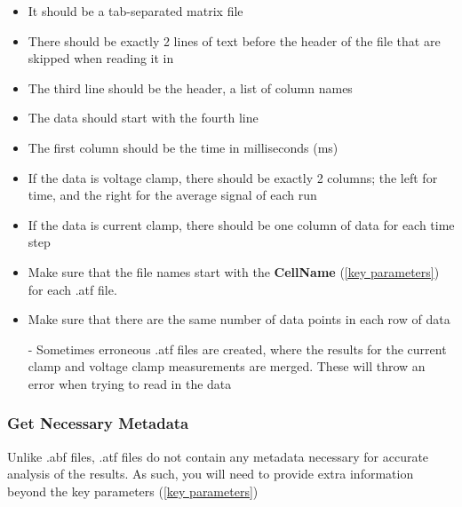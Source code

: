 \documentclass{article}
\begin{document}
\begin{itemize}
    \item It should be a tab-separated matrix file
    
    \item There should be exactly 2 lines of text before the header of the file that are skipped when reading it in
    
    \item The third line should be the header, a list of column names
    
    \item The data should start with the fourth line
    
    \item The first column should be the time in milliseconds (ms)
    
    \item If the data is voltage clamp, there should be exactly 2 columns; the left for time, and the right for the average signal of each run
    
    \item If the data is current clamp, there should be one column of data for each time step
    
    \item Make sure that the file names start with the \textbf{CellName} (\ref{key parameters}) for each .atf file.
    
    \item Make sure that there are the same number of data points in each row of data
    
    - Sometimes erroneous .atf files are created, where the results for the current clamp and voltage clamp measurements are merged. These will throw an error when trying to read in the data
\end{itemize}

\subsubsection{Get Necessary Metadata} \label{Necessary Metadata}

Unlike .abf files, .atf files do not contain any metadata necessary for accurate analysis of the results. As such, you will need to provide extra information beyond the key parameters (\ref{key parameters})
\end{document}
